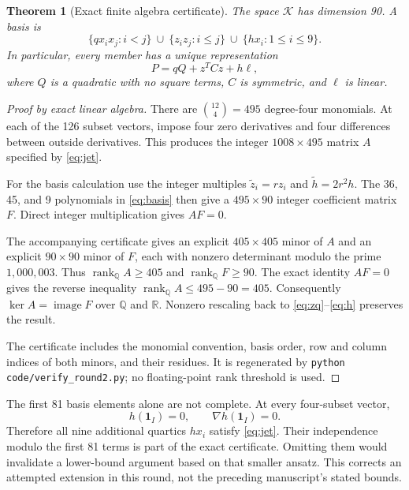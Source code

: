 \documentclass[11pt]{article}
\newtheorem{theorem}{Theorem}[section]
\theoremstyle{remark}\newtheorem{remark}[theorem]{Remark}
\newcommand{\R}{\mathbb R}
\newcommand{\rank}{\operatorname{rank}}
\newcommand{\one}{\mathbf 1}
\begin{document}
\begin{theorem}[Exact finite algebra certificate]\label{thm:quartic}
The space $\mathcal K$ has dimension 90. A basis is
\begin{equation}\label{eq:basis}
 \{q x_i x_j:i<j\}\ \cup\
 \{z_i z_j:i\leq j\}\ \cup\
 \{h x_i:1\leq i\leq9\}.
\end{equation}
In particular, every member has a unique representation
\begin{equation}\label{eq:fullquartic}
 P=qQ+z^TCz+h\ell,
\end{equation}
where $Q$ is a quadratic with no square terms, $C$ is symmetric, and $\ell$ is linear.
\end{theorem}
\begin{proof}[Proof by exact linear algebra]
There are $\binom{12}{4}=495$ degree-four monomials. At each of the 126 subset vectors, impose four zero derivatives and four differences between outside derivatives. This produces the integer $1008\times495$ matrix $A$ specified by \eqref{eq:jet}.

For the basis calculation use the integer multiples $\widetilde z_i=r z_i$ and $\widetilde h=2r^2h$. The 36, 45, and 9 polynomials in \eqref{eq:basis} then give a $495\times90$ integer coefficient matrix $F$. Direct integer multiplication gives $AF=0$.

The accompanying certificate gives an explicit $405\times405$ minor of $A$ and an explicit $90\times90$ minor of $F$, each with nonzero determinant modulo the prime $1{,}000{,}003$. Thus $\rank_{\mathbb Q}A\geq405$ and $\rank_{\mathbb Q}F\geq90$. The exact identity $AF=0$ gives the reverse inequality $\rank_{\mathbb Q}A\leq495-90=405$. Consequently $\ker A=\operatorname{image}F$ over $\mathbb Q$ and $\R$. Nonzero rescaling back to \eqref{eq:zq}--\eqref{eq:h} preserves the result.

The certificate includes the monomial convention, basis order, row and column indices of both minors, and their residues. It is regenerated by \texttt{python code/verify\_round2.py}; no floating-point rank threshold is used.
\end{proof}

The first 81 basis elements alone are not complete. At every four-subset vector,
\begin{equation}\label{eq:hjet}
 h(\one_I)=0,\qquad \nabla h(\one_I)=0.
\end{equation}
Therefore all nine additional quartics $hx_i$ satisfy \eqref{eq:jet}. Their independence modulo the first 81 terms is part of the exact certificate. Omitting them would invalidate a lower-bound argument based on that smaller ansatz. This corrects an attempted extension in this round, not the preceding manuscript's stated bounds.
\end{document}
